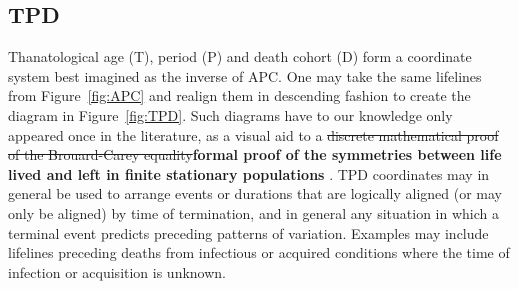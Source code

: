 \documentclass[12pt,oneside,letter]{article} %
\newcommand\tgh[1]{\raisebox{-.25\height}{\texttt{[image: Figures/triadtable/triad\#1.pdf]}}}
\begin{document}
\FloatBarrier
\subsection*{TPD}%
\FloatBarrier
Thanatological age (T), period (P) and death cohort (D) form a coordinate system
best imagined as the inverse of APC. One may take the same lifelines from
Figure~\ref{fig:APC} and realign them in descending fashion to create the
diagram in Figure~\ref{fig:TPD}. Such diagrams have to our knowledge only
appeared once in the literature, as a visual aid to a \sout{discrete mathematical
proof of the Brouard-Carey equality}\textbf{formal proof of the symmetries between life lived and left in finite stationary populations}
\citep{pancho2015}. TPD coordinates may in general be used to arrange events or
durations that are logically aligned (or may only be aligned) by time of
termination, and in general any
situation in which a terminal event predicts preceding patterns of variation.
Examples may include lifelines preceding deaths from infectious or acquired
conditions where the time of infection or acquisition is unknown. 
\end{document}
